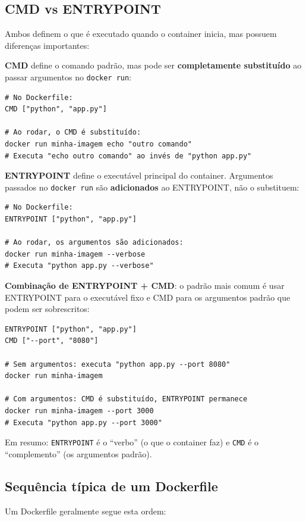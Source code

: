 \subsection{CMD vs ENTRYPOINT}

Ambos definem o que é executado quando o container inicia, mas possuem diferenças importantes:

\textbf{CMD} define o comando padrão, mas pode ser \textbf{completamente substituído} ao passar argumentos no \texttt{docker run}:

\begin{verbatim}
# No Dockerfile:
CMD ["python", "app.py"]

# Ao rodar, o CMD é substituído:
docker run minha-imagem echo "outro comando"
# Executa "echo outro comando" ao invés de "python app.py"
\end{verbatim}

\textbf{ENTRYPOINT} define o executável principal do container. Argumentos passados no \texttt{docker run} são \textbf{adicionados} ao ENTRYPOINT, não o substituem:

\begin{verbatim}
# No Dockerfile:
ENTRYPOINT ["python", "app.py"]

# Ao rodar, os argumentos são adicionados:
docker run minha-imagem --verbose
# Executa "python app.py --verbose"
\end{verbatim}

\textbf{Combinação de ENTRYPOINT + CMD}: o padrão mais comum é usar ENTRYPOINT para o executável fixo e CMD para os argumentos padrão que podem ser sobrescritos:

\begin{verbatim}
ENTRYPOINT ["python", "app.py"]
CMD ["--port", "8080"]

# Sem argumentos: executa "python app.py --port 8080"
docker run minha-imagem

# Com argumentos: CMD é substituído, ENTRYPOINT permanece
docker run minha-imagem --port 3000
# Executa "python app.py --port 3000"
\end{verbatim}

Em resumo: \texttt{ENTRYPOINT} é o ``verbo'' (o que o container faz) e \texttt{CMD} é o ``complemento'' (os argumentos padrão).

\subsection{Sequência típica de um Dockerfile}

Um Dockerfile geralmente segue esta ordem:

